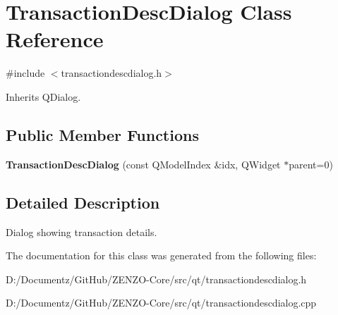 \hypertarget{class_transaction_desc_dialog}{}\section{Transaction\+Desc\+Dialog Class Reference}
\label{class_transaction_desc_dialog}


{\ttfamily \#include $<$transactiondescdialog.\+h$>$}



Inherits Q\+Dialog.

\subsection*{Public Member Functions}
\begin{DoxyCompactItemize}
\item 
\mbox{\label{class_transaction_desc_dialog_aa4431a7da806415ed068437cabd6e9bc}} 
{\bfseries Transaction\+Desc\+Dialog} (const Q\+Model\+Index \&idx, Q\+Widget $\ast$parent=0)
\end{DoxyCompactItemize}


\subsection{Detailed Description}
Dialog showing transaction details. 

The documentation for this class was generated from the following files\+:\begin{DoxyCompactItemize}
\item 
D\+:/\+Documentz/\+Git\+Hub/\+Z\+E\+N\+Z\+O-\/\+Core/src/qt/transactiondescdialog.\+h\item 
D\+:/\+Documentz/\+Git\+Hub/\+Z\+E\+N\+Z\+O-\/\+Core/src/qt/transactiondescdialog.\+cpp\end{DoxyCompactItemize}

